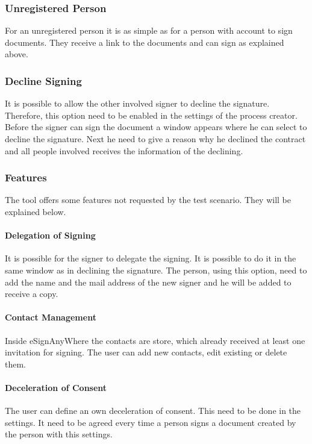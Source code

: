 \subsubsection{Unregistered Person}
For an unregistered person it is as simple as for a person with account to sign documents. They receive a link to the documents and can sign as explained above. 

\subsubsection{Decline Signing}
It is possible to allow the other involved signer to decline the signature. Therefore, this option need to be enabled in the settings of the process creator. Before the signer can sign the document a window appears where he can select to decline the signature. Next he need to give a reason why he declined the contract and all people involved receives the information of the declining.

\subsubsection{Features}
The tool offers some features not requested by the test scenario. They will be explained below.

\paragraph{Delegation of Signing}
It is possible for the signer to delegate the signing. It is possible to do it in the same window as in declining the signature. The person, using this option, need to add the name and the mail address of the new signer and he will be added to receive a copy.

\paragraph{Contact Management}
Inside eSignAnyWhere the contacts are store, which already received at least one invitation for signing. The user can add new contacts, edit existing or delete them.

\paragraph{Deceleration of Consent}
The user can define an own deceleration of consent. This need to be done in the settings. It need to be agreed every time a person signs a document created by the person with this settings.

